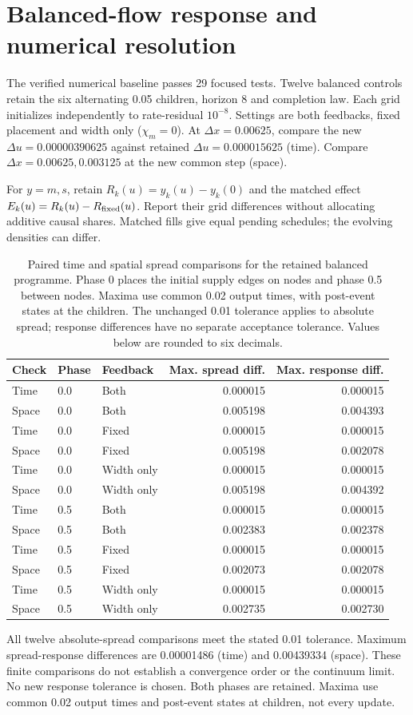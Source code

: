 \documentclass[11pt,a4paper]{article}
\newcommand{\du}{\Delta u}\newcommand{\dx}{\Delta x}\newcommand{\lap}{\delta_x^2}
\begin{document}
\section{Balanced-flow response and numerical resolution}
The verified numerical baseline passes 29 focused tests. Twelve balanced controls retain the six alternating
0.05 children, horizon 8 and completion law. Each grid initializes independently
to rate-residual $10^{-8}$. Settings are both feedbacks, fixed placement and
width only ($\chi_m=0$). At $\dx=0.00625$, compare the new
$\du=0.00000390625$ against retained $\du=0.000015625$ (time).
Compare $\dx=0.00625,0.003125$ at the new common step (space).

For $y=m,s$, retain $R_k(u)=y_k(u)-y_k(0)$ and the matched effect
$E_k(u)=R_k(u)-R_{\rm fixed}(u)$. Report their grid differences without
allocating additive causal shares. Matched fills give equal pending schedules;
the evolving densities can differ.

\begin{table}[H]\centering\small
\caption{Paired time and spatial spread comparisons for the retained balanced programme. Phase 0 places the initial supply edges on nodes and phase 0.5 between nodes. Maxima use common 0.02 output times, with post-event states at the children. The unchanged 0.01 tolerance applies to absolute spread; response differences have no separate acceptance tolerance. Values below are rounded to six decimals.}\label{tab:refinement}
\begin{tabular}{lllrr}
\toprule
Check & Phase & Feedback & Max. spread diff. & Max. response diff.\\
\midrule
Time & 0.0 & Both & 0.000015 & 0.000015 \\
Space & 0.0 & Both & 0.005198 & 0.004393 \\
Time & 0.0 & Fixed & 0.000015 & 0.000015 \\
Space & 0.0 & Fixed & 0.005198 & 0.002078 \\
Time & 0.0 & Width only & 0.000015 & 0.000015 \\
Space & 0.0 & Width only & 0.005198 & 0.004392 \\
Time & 0.5 & Both & 0.000015 & 0.000015 \\
Space & 0.5 & Both & 0.002383 & 0.002378 \\
Time & 0.5 & Fixed & 0.000015 & 0.000015 \\
Space & 0.5 & Fixed & 0.002073 & 0.002078 \\
Time & 0.5 & Width only & 0.000015 & 0.000015 \\
Space & 0.5 & Width only & 0.002735 & 0.002730 \\
\bottomrule
\end{tabular}
\end{table}
All twelve absolute-spread comparisons meet the stated 0.01 tolerance.
Maximum spread-response differences are 0.00001486 (time) and
0.00439334 (space).
These finite comparisons do not establish a convergence order or the continuum
limit. No new response tolerance is chosen. Both phases are retained. Maxima
use common 0.02 output times and post-event states at children, not every update.
\end{document}

